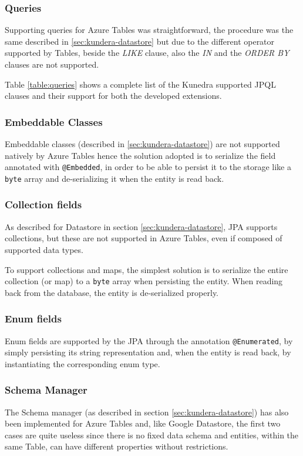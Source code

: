 \subsubsection{Queries}
Supporting queries for Azure Tables was straightforward, the procedure was the same described in \ref{sec:kundera-datastore} but due to the different operator supported by Tables, beside the \textit{LIKE} clause, also the \textit{IN} and the \textit{ORDER BY} clauses are not supported.

\newparagraph Table \ref{table:queries} shows a complete list of the Kunedra supported JPQL clauses and their support for both the developed extensions.

\subsubsection{Embeddable Classes}
Embeddable classes (described in \ref{sec:kundera-datastore}) are not supported natively by Azure Tables hence the solution adopted is to serialize the field annotated with \texttt{@Embedded}, in order to be able to persist it to the storage like a \texttt{byte} array and de-serializing it when the entity is read back.

\subsubsection{Collection fields}
As described for Datastore in section \ref{sec:kundera-datastore}, JPA supports collections, but these are not supported in Azure Tables, even if composed of supported data types.

\noindent To support collections and maps, the simplest solution is to serialize the entire collection (or map) to a \texttt{byte} array when persisting the entity. When reading back from the database, the entity is de-serialized properly.

\subsubsection{Enum fields}
Enum fields are supported by the JPA through the annotation \texttt{@Enumerated}, by simply  persisting its string representation and, when the entity is read back, by instantiating the corresponding enum type.

\subsubsection{Schema Manager}
The Schema manager (as described in section \ref{sec:kundera-datastore}) has also been implemented for Azure Tables and, like Google Datastore, the first two cases are quite useless since there is no fixed data schema and entities, within the same Table, can have different properties without restrictions.


